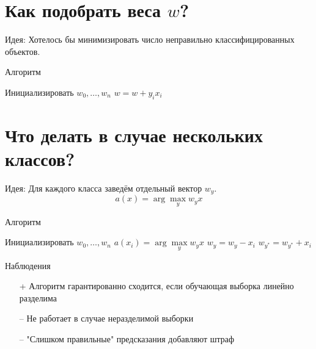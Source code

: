 \documentclass[10pt]{beamer}
\begin{document}
\section{Как подобрать веса $w$?}

\begin{frame}
  \alert{Идея}: Хотелось бы минимизировать число неправильно классифицированных объектов.
\end{frame}

\begin{frame}{Алгоритм}
	\begin{algorithmic}[1]
            \State Инициализировать ${w_0, \dots, w_n}$
                   \State $w = w + y_i x_i$
                 \EndIf  
               \EndFor
           	\EndRepeat
        \EndFunction
    \end{algorithmic}
\end{frame}

\section{Что делать в случае нескольких классов?}

\begin{frame}
  \alert{Идея}: Для каждого класса заведём отдельный вектор $w_y$.
  \bigbreak \pause
  $$a(x) = \arg\max\limits_{y} w_y x $$
\end{frame}

\begin{frame}{Алгоритм}
	\begin{algorithmic}[1]
            \State Инициализировать ${w_0, \dots, w_n}$
                 \State $a(x_i) = \arg\max\limits_{y} w_y x$                 
                   \State $w_y = w_y - x_i$
                   \State $w_{y^{*}} = w_{y^{*}} + x_i$
                 \EndIf  
               \EndFor
           	\EndRepeat
        \EndFunction
    \end{algorithmic}
\end{frame}

\begin{frame} {Наблюдения}
    \begin{itemize} [<+->]
      \item[+] Алгоритм гарантированно сходится, если обучающая выборка линейно разделима
      \bigbreak
      \item[--] Не работает в случае неразделимой выборки 
      \item[--] "Слишком правильные" предсказания добавляют штраф       
    \end{itemize}
\end{frame}
\end{document}
